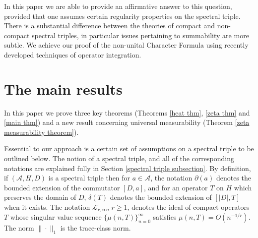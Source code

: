    In this paper we are able to provide an affirmative answer to this question, provided that one assumes certain regularity properties on the spectral triple.
    There is a substantial difference between the theories of compact and non-compact spectral triples, in particular issues pertaining to summability are 
    more subtle. We achieve our proof of the non-unital Character Formula using recently developed techniques of operator integration.


\section{The main results}

    In this paper we prove three key theorems (Theorems \ref{heat thm}, \ref{zeta thm} and \ref{main thm}) and a new result concerning universal measurability (Theorem \ref{zeta measurability theorem}). 

    Essential to our approach is a certain set of assumptions on a spectral triple to be outlined below. The notion of a spectral triple, and all of the corresponding notations are explained fully in Section \ref{spectral triple subsection}. By definition, if $(\mathcal{A},H,D)$ is a spectral triple then for $a \in \mathcal{A}$, the notation $\partial(a)$ denotes the bounded
    extension of the commutator $[D,a]$, and for an operator $T$ on $H$ which preserves the domain of $D$, $\delta(T)$ denotes the bounded extension of $[|D|,T]$ when it exists.
    The notation $\mathcal{L}_{r,\infty}$, $r \geq 1$, denotes the ideal of compact operators $T$ whose singular value sequence $\{\mu(n,T)\}_{n=0}^\infty$ satisfies $\mu(n,T) = O(n^{-1/r})$.
    The norm $\|\cdot\|_1$ is the trace-class norm. 
    
